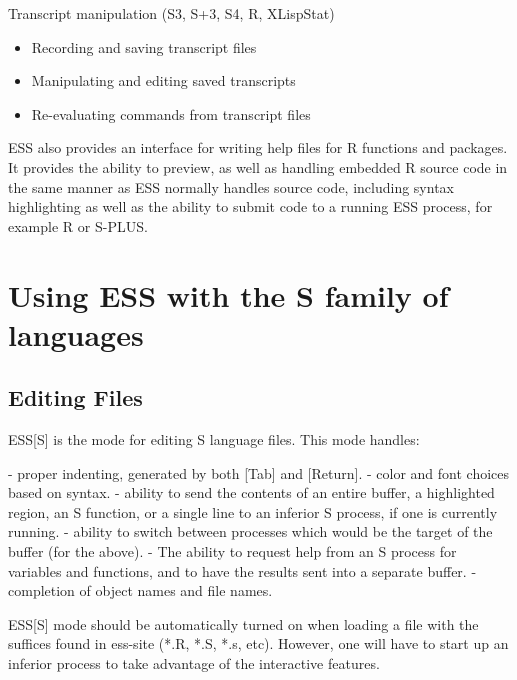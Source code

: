 \documentclass{article}
\begin{document}
Transcript manipulation (S3, S+3, S4, R, XLispStat)
\begin{itemize}
\item Recording and saving transcript files
\item Manipulating and editing saved transcripts
\item Re-evaluating commands from transcript files
\end{itemize}

ESS also provides an interface for writing help files for R functions
and packages.    It provides the ability to preview, as well as
handling embedded R source code in the same manner as ESS normally
handles source code, including syntax highlighting as well as the
ability to submit code to a running ESS process, for example R or
S-PLUS. 


\section{Using ESS with the S family of languages}
\label{sec:S}

\subsection{Editing Files}
\label{sec:S:edit}


ESS[S] is the mode for editing S language files.  This mode handles:

- proper indenting, generated by both [Tab] and [Return].
- color and font choices based on syntax.
- ability to send the contents of an entire buffer, a highlighted
  region, an S function, or a single line to an inferior S process, if
  one is currently running.
- ability to switch between processes which would be the target of the 
  buffer (for the above).
- The ability to request help from an S process for variables and
  functions, and to have the results sent into a separate buffer.
- completion of object names and file names.

ESS[S] mode should be automatically turned on when loading a file with
the suffices found in ess-site (*.R, *.S, *.s, etc).  However, one
will have to start up an inferior process to take advantage of the
interactive features.
\end{document}

